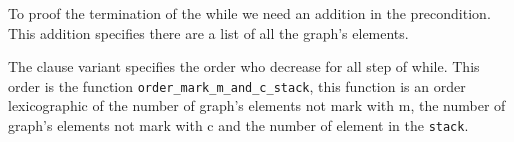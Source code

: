 To proof the termination of the while we need an addition in the
precondition. This addition specifies there are a list of all the
graph's elements.

The clause variant specifies the order who decrease for all step of
while. This order is the function \verb|order_mark_m_and_c_stack|, this
function is an order lexicographic of the number of graph's elements
not mark with m, the number of graph's elements not mark with c and the number
of element in the \texttt{stack}. 





